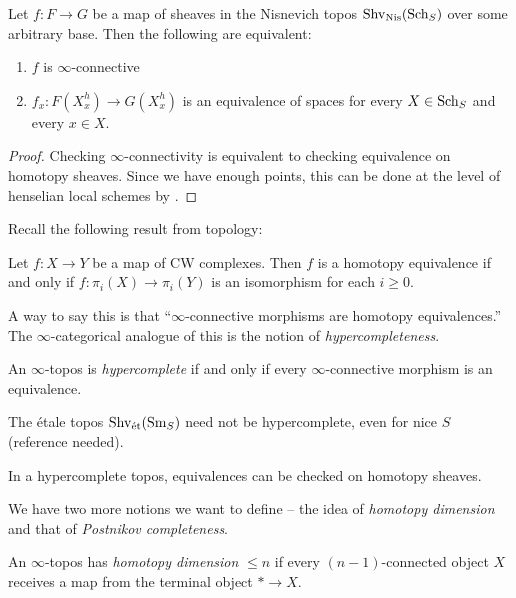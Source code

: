 \documentclass[11pt,openany]{book}
\begin{document}
\begin{proposition}[$\infty$-connective=stalkwise]
\label{prop:infty-connective-is-stalkwise}
Let $f \colon F \to G$ be a map of sheaves in the Nisnevich topos $\mathrm{Shv}_{\mathrm{Nis}}(\mathrm{Sch}_S)$ over some arbitrary base. Then the following are equivalent:
\begin{enumerate}
    \item $f$ is $\infty$-connective
    \item $f_x \colon F(X_x^h) \to G(X_x^h)$ is an equivalence of spaces for every $X\in \mathrm{Sch}_S$ and every $x\in X$.
\end{enumerate}
\end{proposition}
\begin{proof} Checking $\infty$-connectivity is equivalent to checking equivalence on homotopy sheaves. Since we have enough points, this can be done at the level of henselian local schemes by .
\end{proof}

Recall the following result from topology:
\begin{theorem}
Let $f \colon X \to Y$ be a map of CW complexes. Then $f$ is a homotopy equivalence if and only if $f \colon \pi_i(X) \to \pi_i(Y)$ is an isomorphism for each $i\ge0$.
\end{theorem}

A way to say this is that ``$\infty$-connective morphisms are homotopy equivalences.'' The $\infty$-categorical analogue of this is the notion of \textit{hypercompleteness}.

\begin{definition}
An $\infty$-topos is \textit{hypercomplete} if and only if every $\infty$-connective morphism is an equivalence.
\end{definition}
\begin{warning} The \'etale topos $\mathrm{Shv}_{\text{\'{e}t}}(\mathrm{Sm}_S)$ need not be hypercomplete, even for nice $S$ (reference needed).
\end{warning}

\begin{upshot} In a hypercomplete topos, equivalences can be checked on homotopy sheaves.
\end{upshot}

We have two more notions we want to define -- the idea of \textit{homotopy dimension} and that of \textit{Postnikov completeness}.

\begin{definition} \cite[7.2.11]{HTT} An $\infty$-topos has \textit{homotopy dimension} $\le n$ if every $(n-1)$-connected object $X$ receives a map from the terminal object $\ast \to X$.
\end{definition}
\end{document}
